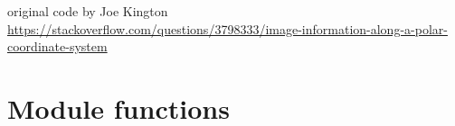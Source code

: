 \documentclass[a4paper,10pt,english]{sphinxmanual}
\begin{document}
\begin{fulllineitems}
\begin{fulllineitems}
\begin{description}
\end{description}

original code by Joe Kington
\href{https://stackoverflow.com/questions/3798333/image-information-along-a-polar-coordinate-system}{https://stackoverflow.com/questions/3798333/image-information-along-a-polar-coordinate-system}

\end{fulllineitems}


\end{fulllineitems}



\section{Module functions}
\label{ryplot:module-functions}
\end{document}

